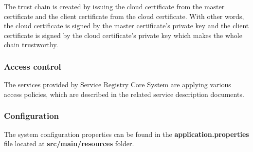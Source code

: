 \documentclass[a4paper]{arrowhead}
\begin{document}
The trust chain is created by issuing the cloud certificate from the master certificate and the client certificate from the cloud certificate. With other words, the cloud certificate is signed by the master certificate's private key and the client certificate is signed by the cloud certificate's private key which makes the whole chain trustworthy.

\subsubsection {Access control}
The services provided by Service Registry Core System are applying various access policies, which are described in the related service description documents.

\subsubsection {Configuration}
   
The system configuration properties can be found in the \textbf{application.properties} file located at \textbf{src/main/resources} folder.
\end{document}
